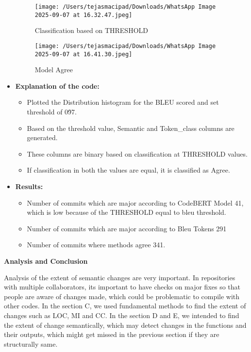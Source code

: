 \documentclass[12pt, a4paper]{report}
\newcommand{\sectionbar}[1]{%
  \vspace{0.6\baselineskip}%
  \noindent
  \colorbox{sectionbar}{%
    \parbox{\dimexpr\linewidth-2\fboxsep\relax}{%
      \textbf{\Large\textsf{#1}}%
    }%
  }%
  \vspace{0.6\baselineskip}
}
\begin{document}
\begin{itemize}
        \begin{figure}[!h] 
            \centering
            \texttt{[image: /Users/tejasmacipad/Downloads/WhatsApp Image 2025-09-07 at 16.32.47.jpeg]}
            \caption{Classification based on THRESHOLD}
            \label{fig:diff-example-15}
        \end{figure}

        \begin{figure}[!h] 
            \centering
            \texttt{[image: /Users/tejasmacipad/Downloads/WhatsApp Image 2025-09-07 at 16.41.30.jpeg]}
            \caption{Model Agree}
            \label{fig:diff-example-16}
        \end{figure}

        \item \textbf{Explanation of the code:}
        \begin{itemize}
            \item Plotted the Distribution histogram for the BLEU scored and set threshold of 0\.97.
            \item Based on the threshold value, Semantic and Token\_class columns are generated.
            \item These columns are binary based on classification at THRESHOLD values.
            \item If classification in both the values are equal, it is classified as Agree.
        \end{itemize}

         \item \textbf{Results:}
        \begin{itemize}
            \item Number of commits which are major according to CodeBERT Model 41, which is low because of the THRESHOLD equal to bleu threshold.
            \item Number of commits which are major according to Bleu Tokens 291
            \item Number of commits where methods agree 341.
        \end{itemize}

\end{itemize}

\sectionbar{Analysis and Conclusion}

Analysis of the extent of semantic changes are very important. In repositories with multiple collaborators, its important to have checks on major fixes so that people are aware of changes made, which could be problematic to compile with other codes.
In the section C, we used fundamental methods to find the extent of changes such as LOC, MI and CC. In the section D and E, we intended to find the extent of change semantically, which may detect changes in the functions and their outputs, which might get missed in the previous section if they are structurally same.
\end{document}
